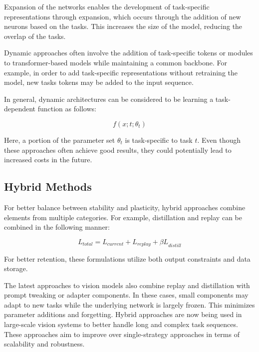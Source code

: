 \documentclass[english, LaM, oneside]{sapthesis}%
\numberwithin{equation}{chapter}
\begin{document}
Expansion of the networks enables the development of task-specific representations through expansion, which occurs through the addition of new neurons based on the tasks. This increases the size of the model, reducing the overlap of the tasks.

Dynamic approaches often involve the addition of task-specific tokens or modules to transformer-based models while maintaining a common backbone\cite{11}. For example, in order to add task-specific representations without retraining the model, new tasks tokens may be added to the input sequence.

In general, dynamic architectures can be considered to be learning a task-dependent function as follows:

\begin{equation}
    f(x;t;\theta_t)
\end{equation}

Here, a portion of the parameter set $\theta_t$ is task-specific to task $t$. Even though these approaches often achieve good results, they could potentially lead to increased costs in the future.

\subsection{Hybrid Methods}
For better balance between stability and plasticity, hybrid approaches combine elements from multiple categories. For example, distillation and replay\cite{9} can be combined in the following manner:

\begin{equation}
    L_{total}=L_{current}+L_{replay}+{\beta L}_{distill}
\end{equation}

For better retention, these formulations utilize both output constraints and data storage.

The latest approaches to vision models also combine replay and distillation with prompt tweaking or adapter components\cite{5}. In these cases, small components may adapt to new tasks while the underlying network is largely frozen\cite{22}. This minimizes parameter additions and forgetting.
Hybrid approaches are now being used in large-scale vision systems to better handle long and complex task sequences\cite{12}. These approaches aim to improve over single-strategy approaches in terms of scalability and robustness.
\end{document}
